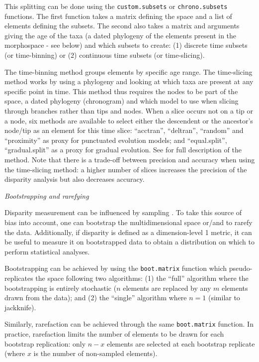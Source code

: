 \documentclass[12pt,letterpaper]{article}
\renewcommand{\subsection}[1]{%
\bigskip
\begin{center}
\begin{large}
\normalfont\itshape #1
\end{large}
\end{center}}
\begin{document}
This splitting can be done using the \texttt{custom.subsets} or \texttt{chrono.subsets} functions.
The first function takes a matrix defining the space and a list of elements defining the subsets.
The second also takes a matrix and arguments giving the age of the taxa (a dated phylogeny of the elements present in the morphospace - see below) and which subsets to create: (1) discrete time subsets (or time-binning) or (2) continuous time subsets (or time-slicing).

The time-binning method groups elements by specific age range.
The time-slicing method works by using a phylogeny and looking at which taxa are present at any specific point in time.
This method thus requires the nodes to be part of the space, a dated phylogeny (chronogram) and which model to use when slicing through branches rather than tips and nodes.
When a slice occurs not on a tip or a node, six methods are available to select either the descendent or the ancestor's node/tip as an element for this time slice:
``acctran'', ``deltran'', ``random'' and ``proximity'' as proxy for punctuated evolution models; and ``equal.split'', ``gradual.split'' as a proxy for gradual evolution.
See \cite{time-slice} for full description of the method.
Note that there is a trade-off between precision and accuracy when using the time-slicing method: a higher number of slices increases the precision of the disparity analysis but also decreases accuracy.

\subsection{Bootstrapping and rarefying}
Disparity measurement can be influenced by sampling \citep{Butler2012}.
To take this source of bias into account, one can bootstrap the multidimensional space or/and to rarefy the data.
Additionally, if disparity is defined as a dimension-level 1 metric, it can be useful to measure it on bootstrapped data to obtain a distribution on which to perform statistical analyses.

Bootstrapping can be achieved by using the \texttt{boot.matrix} function which pseudo-replicates the space following two algorithms: (1) the ``full'' algorithm where the bootstrapping is entirely stochastic ($n$ elements are replaced by any $m$ elements drawn from the data); and (2) the ``single'' algorithm where $n = 1$ (similar to jackknife).

Similarly, rarefaction can be achieved through the same \texttt{boot.matrix} function.
In practice, rarefaction limits the number of elements to be drawn for each bootstrap replication: only $n-x$ elements are selected at each bootstrap replicate (where $x$ is the number of non-sampled elements).
\end{document}
